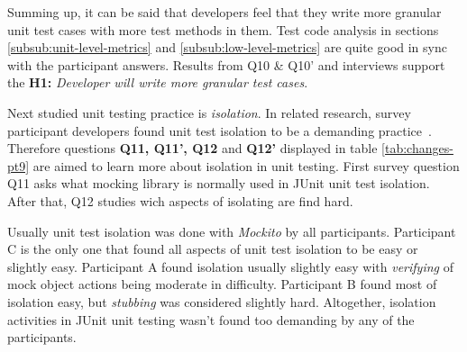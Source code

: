 Summing up, it can be said that developers feel that they write more granular unit test cases with more test methods in them.
Test code analysis in sections \ref{subsub:unit-level-metrics} and \ref{subsub:low-level-metrics}
are quite good in sync with the participant answers.
Results from Q10 \& Q10' and interviews support the \textbf{H1:} \textit{Developer will write more granular test cases}.

Next studied unit testing practice is \textit{isolation}. In related research, survey participant developers found unit test isolation to be a demanding practice~\cite{daka2014survey}.
Therefore questions \textbf{Q11, Q11', Q12} and \textbf{Q12'} displayed in table \ref{tab:changes-pt9} are aimed to learn more about isolation in unit testing.
First survey question Q11 asks what mocking library is normally used in JUnit unit test isolation. After that,
Q12 studies wich aspects of isolating are find hard.

Usually unit test isolation was done with \textit{Mockito} by all participants. Participant C is the only
one that found all aspects of unit test isolation to be easy or slightly easy. Participant A found isolation
usually slightly easy with \textit{verifying} of mock object actions being moderate in difficulty. Participant B
found most of isolation easy, but \textit{stubbing} was considered slightly hard. Altogether, isolation activities in JUnit unit testing
wasn't found too demanding by any of the participants.

